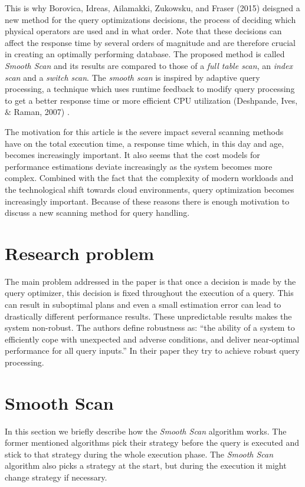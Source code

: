\documentclass[a4paper,11pt,twoside]{article}
\begin{document}
This is why Borovica, Idreas, Ailamakki, Zukowsku, and Fraser (2015) \cite{smoothscan} deisgned a new method for the query optimizations decisions, the process of deciding which physical operators are used and in what order. Note that these decisions can affect the response time by several orders of magnitude and are therefore crucial in creating an optimally performing database. The proposed method is called \emph{Smooth Scan} and its results are compared to those of a \emph{full table scan}, an \emph{index scan} and a \emph{switch scan}. The \emph{smooth scan} is inspired by adaptive query processing, a technique which uses runtime feedback to modify query processing to get a better response time or more efficient CPU utilization (Deshpande, Ives, $\&$ Raman, 2007) \cite{query}.

The motivation for this article is the severe impact several scanning methods have on the total execution time, a response time which, in this day and age, becomes increasingly important. It also seems that the cost models for performance estimations deviate increasingly as the system becomes more complex. Combined with the fact that the complexity of modern workloads and the technological shift towards cloud environments, query optimization becomes increasingly important. Because of these reasons there is enough motivation to discuss a new scanning method for query handling.

\section{Research problem}
The main problem addressed in the paper is that once a decision is made by the query optimizer, this decision is fixed throughout the execution of a query. This can result in suboptimal plans and even a small estimation error can lead to drastically different performance results. These unpredictable results makes the system non-robust. The authors define robustness as: “the ability of a system to efficiently cope with unexpected and adverse conditions, and deliver near-optimal performance for all query inputs.” In their paper they try to achieve robust query processing.

\section{Smooth Scan}
In this section we briefly describe how the \emph{Smooth Scan} algorithm works. The former mentioned algorithms pick their strategy before the query is executed and stick to that strategy during the whole execution phase. The \emph{Smooth Scan} algorithm also picks a strategy at the start, but during the execution it might change strategy if necessary.
\end{document}

